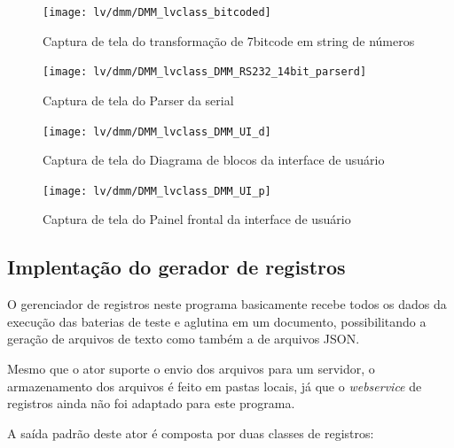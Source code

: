             
            \begin{figure}
                \centering
                \texttt{[image: lv/dmm/DMM\_lvclass\_bitcoded]}
                \caption{Captura de tela do transformação de 7bitcode em string de números}
                \label{fig:dmmbitcode}
            \end{figure}
            
            
            \begin{figure}
                \centering
                \texttt{[image: lv/dmm/DMM\_lvclass\_DMM\_RS232\_14bit\_parserd]}
                \caption{Captura de tela do Parser da serial}
                \label{fig:dmmparser}
            \end{figure}
            
            
            \begin{figure}
                \centering
                \texttt{[image: lv/dmm/DMM\_lvclass\_DMM\_UI\_d]}
                \caption{Captura de tela do Diagrama de blocos da interface de usuário}
                \label{fig:dmmfpbd}
            \end{figure}
            
            \begin{figure}
                \centering
                \texttt{[image: lv/dmm/DMM\_lvclass\_DMM\_UI\_p]}
                \caption{Captura de tela do Painel frontal da interface de usuário}
                \label{fig:dmmfp}
            \end{figure}
            
            
        \clearpage
        \subsection{Implentação do gerador de registros}
            
            O gerenciador de registros neste programa basicamente recebe todos os dados da execução das baterias de teste e aglutina em um documento, possibilitando a geração de arquivos de texto como também a de arquivos JSON.
            
            Mesmo que o ator suporte o envio dos arquivos para um servidor, o armazenamento dos arquivos é feito em pastas locais, já que o \textit{webservice} de registros ainda não foi adaptado para este programa.
            
            A saída padrão deste ator é composta por duas classes de registros: 
            
